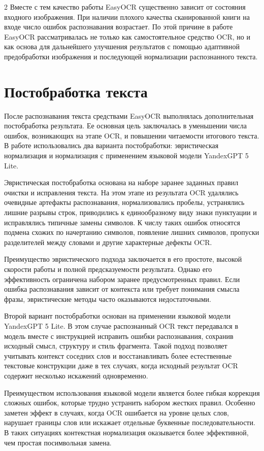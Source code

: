 \documentclass[11pt]{article}
\begin{document}
\begin{multicols}{2}
Вместе с тем качество работы EasyOCR существенно зависит от состояния входного изображения. При наличии плохого качества сканированной книги на входе число ошибок распознавания возрастает. По этой причине в работе EasyOCR рассматривалась не только как самостоятельное средство OCR, но и как основа для дальнейшего улучшения результатов с помощью адаптивной предобработки изображения и последующей нормализации распознанного текста. 
\section{Постобработка текста}
После распознавания текста средствами EasyOCR выполнялась дополнительная постобработка результата. Ее основная цель заключалась в уменьшении числа ошибок, возникающих на этапе OCR, и повышении читаемости итогового текста. В работе использовались два варианта постобработки: эвристическая нормализация и нормализация с применением языковой модели YandexGPT 5 Lite.

Эвристическая постобработка основана на наборе заранее заданных правил очистки и исправления текста. На этом этапе из результата OCR удалялись очевидные артефакты распознавания, нормализовались пробелы, устранялись лишние разрывы строк, приводились к единообразному виду знаки пунктуации и исправлялись типичные замены символов. К числу таких ошибок относятся подмена схожих по начертанию символов, появление лишних символов, пропуски разделителей между словами и другие характерные дефекты OCR.

Преимущество эвристического подхода заключается в его простоте, высокой скорости работы и полной предсказуемости результата. Однако его эффективность ограничена набором заранее предусмотренных правил. Если ошибка распознавания зависит от контекста или требует понимания смысла фразы, эвристические методы часто оказываются недостаточными.

Второй вариант постобработки основан на применении языковой модели YandexGPT 5 Lite. В этом случае распознанный OCR текст передавался в модель вместе с инструкцией исправить ошибки распознавания, сохранив исходный смысл, структуру и стиль фрагмента. Такой подход позволяет учитывать контекст соседних слов и восстанавливать более естественные текстовые конструкции даже в тех случаях, когда исходный результат OCR содержит несколько искажений одновременно.

Преимуществом использования языковой модели является более гибкая коррекция сложных ошибок, которые трудно устранить набором жестких правил. Особенно заметен эффект в случаях, когда OCR ошибается на уровне целых слов, нарушает границы слов или искажает отдельные буквенные последовательности. В таких ситуациях контекстная нормализация оказывается более эффективной, чем простая посимвольная замена.


\end{multicols}
\end{document}

